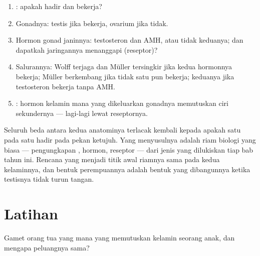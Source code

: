 \begin{method}\label{met:g11:becoming-male-female:case}
\begin{enumerate}
  \item {}: apakah  hadir dan bekerja?
  \item Gonadnya: testis jika  bekerja, ovarium jika tidak.
  \item Hormon gonad janinnya: testosteron dan AMH, atau tidak
        keduanya; dan dapatkah jaringannya menanggapi (reseptor)?
  \item Salurannya: Wolff terjaga dan Müller tersingkir jika kedua
        hormonnya bekerja; Müller berkembang jika tidak satu pun
        bekerja; keduanya jika testosteron bekerja tanpa AMH.
  \item {}: hormon kelamin mana yang dikeluarkan gonadnya
        memutuskan ciri sekundernya --- lagi-lagi lewat reseptornya.
\end{enumerate}
\end{method}

\begin{remark}\label{rem:g11:becoming-male-female:onegene}
Seluruh beda antara kedua anatominya terlacak kembali kepada apakah
satu  pada satu  hadir pada pekan ketujuh. Yang menyusulnya
adalah riam biologi  yang biasa --- pengungkapan , hormon,
reseptor --- dari jenis yang dilukiskan tiap bab tahun ini. Rencana
yang menjadi titik awal riamnya sama pada kedua kelaminnya, dan bentuk
perempuannya adalah bentuk yang dibangunnya ketika testisnya tidak
turun tangan.
\end{remark}

\section{Latihan}

\begin{exercise}[$\star$]\label{exo:g11:becoming-male-female:1}
Gamet orang tua yang mana yang memutuskan kelamin  seorang
anak, dan mengapa peluangnya sama?
\end{exercise}

